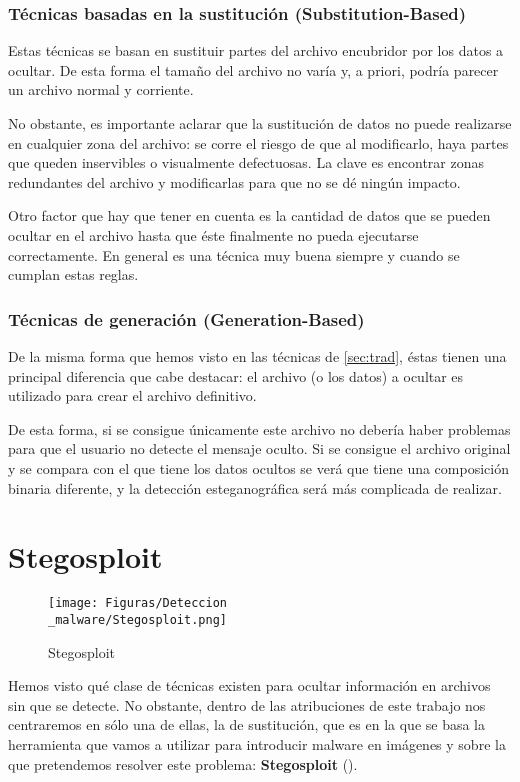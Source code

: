 \subsubsection{Técnicas basadas en la sustitución (Substitution-Based)}

Estas técnicas se basan en sustituir partes del archivo encubridor por los datos a ocultar. De esta forma el tamaño del archivo no varía y, a priori, podría parecer un archivo normal y corriente.

No obstante, es importante aclarar que la sustitución de datos no puede realizarse en cualquier zona del archivo: se corre el riesgo de que al modificarlo, haya partes que queden inservibles o visualmente defectuosas. La clave es encontrar zonas redundantes del archivo y modificarlas para que no se dé ningún impacto.

Otro factor que hay que tener en cuenta es la cantidad de datos que se pueden ocultar en el archivo hasta que éste finalmente no pueda ejecutarse correctamente. En general es una técnica muy buena siempre y cuando se cumplan estas reglas.

\subsubsection{Técnicas de generación (Generation-Based)}

De la misma forma que hemos visto en las técnicas de \ref{sec:trad}, éstas tienen una principal diferencia que cabe destacar: el archivo (o los datos) a ocultar es utilizado para crear el archivo definitivo.

De esta forma, si se consigue únicamente este archivo no debería haber problemas para que el usuario no detecte el mensaje oculto. Si se consigue el archivo original y se compara con el que tiene los datos ocultos se verá que tiene una composición binaria diferente, y la detección esteganográfica será más complicada de realizar.

\section{Stegosploit}

\begin{figure}[H]
  \centering
  \texttt{[image: Figuras/Deteccion\\\_malware/Stegosploit.png]}
  \label{fig:stegosploit}
  \caption{Stegosploit}
\end{figure}

Hemos visto qué clase de técnicas existen para ocultar información en archivos sin que se detecte. No obstante, dentro de las atribuciones de este trabajo nos centraremos en sólo una de ellas, la de sustitución, que es en la que se basa la herramienta que vamos a utilizar para introducir malware en imágenes y sobre la que pretendemos resolver este problema: \textbf{Stegosploit} (\cite{stegosploit}). %

